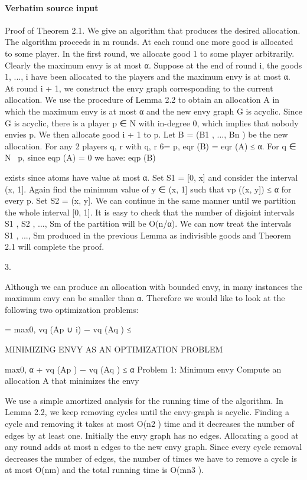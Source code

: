 \documentclass[10pt]{article}
\begin{document}
\paragraph{Verbatim source input}
\begin{ReviewVerbatim}
Proof of Theorem 2.1. We give an algorithm that produces the desired allocation. The algorithm proceeds in m
rounds. At each round one more good is allocated to some
player.
In the first round, we allocate good 1 to some player arbitrarily. Clearly the maximum envy is at most α. Suppose at
the end of round i, the goods {1, ..., i} have been allocated
to the players and the maximum envy is at most α. At
round i + 1, we construct the envy graph corresponding to
the current allocation. We use the procedure of Lemma 2.2
to obtain an allocation A in which the maximum envy is at
most α and the new envy graph G is acyclic. Since G is
acyclic, there is a player p ∈ N with in-degree 0, which implies that nobody envies p. We then allocate good i + 1 to p.
Let B = (B1 , ..., Bn ) be the new allocation. For any 2 players q, r with q, r 6= p, eqr (B) = eqr (A) ≤ α. For q ∈ N \ {p},
since eqp (A) = 0 we have:
eqp (B)

exists since atoms have value at most α. Set S1 = [0, x]
and consider the interval (x, 1]. Again find the minimum
value of y ∈ (x, 1] such that vp ((x, y]) ≤ α for every p. Set
S2 = (x, y]. We can continue in the same manner until we
partition the whole interval [0, 1]. It is easy to check that
the number of disjoint intervals S1 , S2 , ..., Sm of the partition
will be O(n/α).
We can now treat the intervals S1 , ..., Sm produced in the
previous Lemma as indivisible goods and Theorem 2.1 will
complete the proof.

3.

Although we can produce an allocation with bounded
envy, in many instances the maximum envy can be smaller
than α. Therefore we would like to look at the following two
optimization problems:

= max{0, vq (Ap ∪ {i}) − vq (Aq )}
≤

MINIMIZING ENVY AS AN OPTIMIZATION PROBLEM

max{0, α + vq (Ap ) − vq (Aq )} ≤ α
Problem 1: Minimum envy
Compute an allocation A that minimizes the envy

We use a simple amortized analysis for the running time
of the algorithm. In Lemma 2.2, we keep removing cycles
until the envy-graph is acyclic. Finding a cycle and removing it takes at most O(n2 ) time and it decreases the number
of edges by at least one. Initially the envy graph has no
edges. Allocating a good at any round adds at most n edges
to the new envy graph. Since every cycle removal decreases
the number of edges, the number of times we have to remove a cycle is at most O(nm) and the total running time
is O(mn3 ).
\end{ReviewVerbatim}
\end{document}

